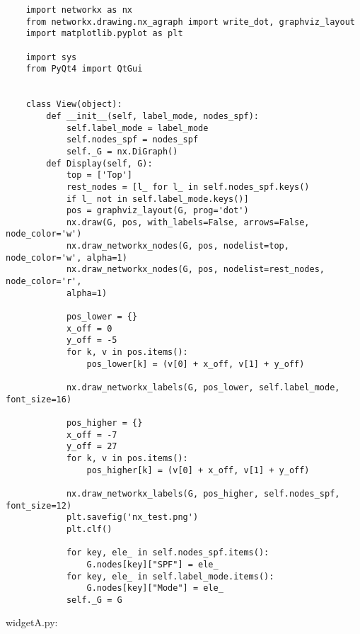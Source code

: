\begin{verbatim}
    import networkx as nx
    from networkx.drawing.nx_agraph import write_dot, graphviz_layout
    import matplotlib.pyplot as plt
    
    import sys
    from PyQt4 import QtGui
    
    
    class View(object):
        def __init__(self, label_mode, nodes_spf):
            self.label_mode = label_mode
            self.nodes_spf = nodes_spf
            self._G = nx.DiGraph()
        def Display(self, G):
            top = ['Top']
            rest_nodes = [l_ for l_ in self.nodes_spf.keys() 
            if l_ not in self.label_mode.keys()]
            pos = graphviz_layout(G, prog='dot')
            nx.draw(G, pos, with_labels=False, arrows=False, node_color='w')
            nx.draw_networkx_nodes(G, pos, nodelist=top, node_color='w', alpha=1)
            nx.draw_networkx_nodes(G, pos, nodelist=rest_nodes, node_color='r', 
            alpha=1)
    
            pos_lower = {}
            x_off = 0
            y_off = -5
            for k, v in pos.items():
                pos_lower[k] = (v[0] + x_off, v[1] + y_off)
    
            nx.draw_networkx_labels(G, pos_lower, self.label_mode, font_size=16)
    
            pos_higher = {}
            x_off = -7
            y_off = 27
            for k, v in pos.items():
                pos_higher[k] = (v[0] + x_off, v[1] + y_off)
    
            nx.draw_networkx_labels(G, pos_higher, self.nodes_spf, font_size=12)
            plt.savefig('nx_test.png')
            plt.clf()
    
            for key, ele_ in self.nodes_spf.items():
                G.nodes[key]["SPF"] = ele_
            for key, ele_ in self.label_mode.items():
                G.nodes[key]["Mode"] = ele_
            self._G = G
\end{verbatim}


widgetA.py:

